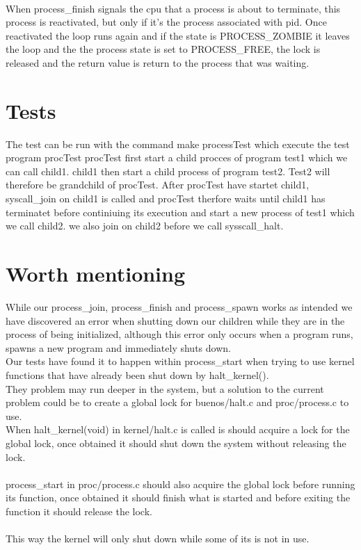 \documentclass[a4paper,12pt,danish]{report}
\begin{document}
\begin{itemize}
  \\
  When process\_finish signals the cpu that a process is about to terminate, this process is reactivated, but only if it's the process associated with pid. Once reactivated the loop runs again and if the state is PROCESS\_ZOMBIE it leaves the loop and the the process state is set to PROCESS\_FREE, the lock is released and the return value is return to the process that was waiting.
\end{itemize}
\section{Tests}
The test can be run with the command make processTest which execute the test program procTest
procTest first start a child procces of program test1 which we can call child1. child1 then start
a child process of program test2. Test2 will therefore be grandchild of procTest.
After procTest have startet child1, syscall_join on child1 is called and procTest therfore waits until
child1 has terminatet before continiuing its execution and start a new process of test1 which we
call child2. we also join on child2 before we call sysscall_halt.

\section{Worth mentioning}
While our process\_join, process\_finish and process\_spawn works as intended we have discovered an error when shutting down our children while they are in the process of being initialized, although this error only occurs when a program runs, spawns a new program and immediately shuts down.
\\
Our tests have found it to happen within process\_start when trying to use kernel functions that have already been shut down by halt\_kernel().
\\
They problem may run deeper in the system, but a solution to the current problem could be to create a global lock for buenos/halt.c and proc/process.c to use.
\\
When halt\_kernel(void) in kernel/halt.c is called is should acquire a lock for the global lock, once obtained it should shut down the system without releasing the lock.
\\
\\
process\_start in proc/process.c should also acquire the global lock before running its function, once obtained it should finish what is started and before exiting the function it should release the lock.
\\
\\
This way the kernel will only shut down while some of its  is not in use.
\end{document}
